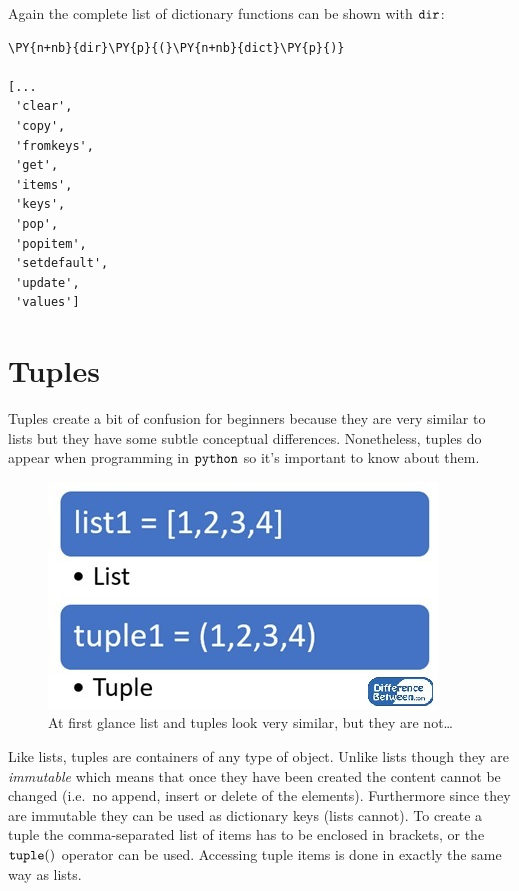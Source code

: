 Again the complete list of dictionary functions can be shown with $\tt{dir}$:

\begin{tcolorbox}[breakable, size=fbox, boxrule=1pt, pad at break*=1mm,colback=cellbackground, colframe=cellborder]
\begin{Verbatim}[commandchars=\\\{\}]
\PY{n+nb}{dir}\PY{p}{(}\PY{n+nb}{dict}\PY{p}{)}

[...
 'clear',
 'copy',
 'fromkeys',
 'get',
 'items',
 'keys',
 'pop',
 'popitem',
 'setdefault',
 'update',
 'values']
\end{Verbatim}
\end{tcolorbox}

\section{Tuples}\label{tuples}

Tuples create a bit of confusion for beginners because they are very similar to lists but they have some subtle conceptual differences.
Nonetheless, tuples do appear when programming in $\tt{python}$ so it's important to know about them.

\begin{figure}
\centering
\includegraphics{Difference-Between-List-and-Tuple-fig-1-2.jpg}
\caption{At first glance list and tuples look very similar, but they are not\ldots{}}
\end{figure}

Like lists, tuples are containers of any type of object. Unlike lists though they are \emph{immutable} which means that once they have been created the content cannot be changed (i.e.~no append, insert or delete of the elements). Furthermore since they are immutable they can be used as dictionary keys (lists cannot).
To create a tuple the comma-separated list of items has to be enclosed in brackets, or the $\tt{tuple()}$ operator can be used.
Accessing tuple items is done in exactly the same way as lists.

